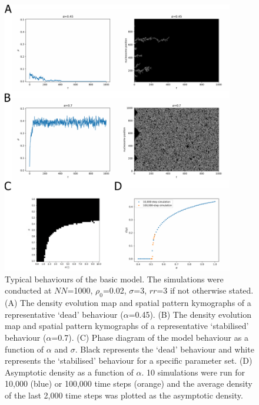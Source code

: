 \begin{figure}[htbp]
  \centering
  \includegraphics[width=0.9\textwidth]{chapter2/figures/model_behaviour.pdf}
  \caption[Typical behaviours of the basic model.]{Typical behaviours of the basic model. The simulations were conducted at $NN$=1000, $\rho_{0}$=0.02, $\sigma$=3, $rr$=3 if not otherwise stated. (A) The density evolution map and spatial pattern kymographs of a representative ‘dead’ behaviour ($\alpha$=0.45). (B) The density evolution map and spatial pattern kymographs of a representative ‘stabilised’ behaviour ($\alpha$=0.7). (C) Phase diagram of the model behaviour as a function of $\alpha$ and $\sigma$. Black represents the ‘dead’ behaviour and white represents the ‘stabilised’ behaviour for a specific parameter set. (D) Asymptotic density as a function of $\alpha$. 10 simulations were run for 10,000 (blue) or 100,000 time steps (orange) and the average density of the last 2,000 time steps was plotted as the asymptotic density. }
  \label{fig:modelBehaviour}
\end{figure}


